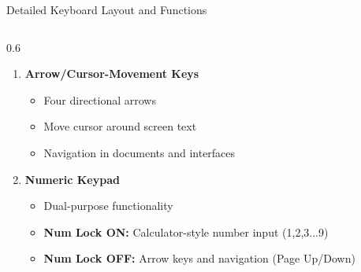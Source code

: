 \documentclass[aspectratio=169]{beamer}
\begin{document}
\begin{frame}{Detailed Keyboard Layout and Functions}
\begin{columns}
\begin{column}{0.6\textwidth}
\begin{enumerate}
        
        \item[4.] \textbf{Arrow/Cursor-Movement Keys}
        \begin{itemize}
            \item Four directional arrows
            \item Move cursor around screen text
            \item Navigation in documents and interfaces
        \end{itemize}

        \item[5.] \textbf{Numeric Keypad}
        \begin{itemize}
            \item Dual-purpose functionality
            \item \textbf{Num Lock ON:} Calculator-style number input (1,2,3...9)
            \item \textbf{Num Lock OFF:} Arrow keys and navigation (Page Up/Down)
        \end{itemize}
  \end{enumerate}
        \end{column}

\end{columns}


        
 
        
    
  
\end{frame}
\end{document}
